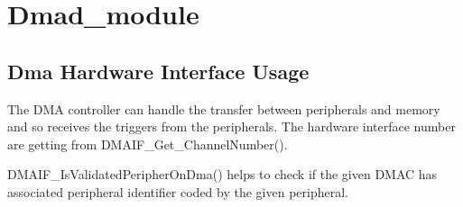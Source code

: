 \hypertarget{group__dmad__module}{}\section{Dmad\+\_\+module}
\label{group__dmad__module}
\hypertarget{group__dmad__module_DmaHw}{}\subsection{Dma Hardware Interface Usage}\label{group__dmad__module_DmaHw}

\begin{DoxyItemize}
\item The D\+MA controller can handle the transfer between peripherals and memory and so receives the triggers from the peripherals. The hardware interface number are getting from D\+M\+A\+I\+F\+\_\+\+Get\+\_\+\+Channel\+Number().


\item D\+M\+A\+I\+F\+\_\+\+Is\+Validated\+Peripher\+On\+Dma() helps to check if the given D\+M\+AC has associated peripheral identifier coded by the given peripheral.


\end{DoxyItemize}